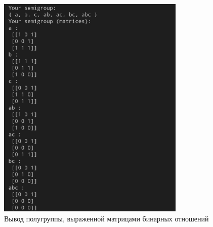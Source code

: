 \documentclass[bachelor, och, labwork]{shiza}
\begin{document}
      \begin{figure}[H]
        \centering
        \includegraphics[width=0.8\textwidth]{photo/3.png}
        \caption{Вывод полугруппы, выраженной матрицами бинарных отношений}
      \end{figure}
\end{document}
